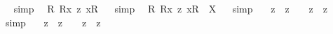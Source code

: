 \begin{isabellebody}
\isadelimproof
\ %
\endisadelimproof
%
\isatagproof
{}\isamarkupfalse%
\ {\isacharparenleft}simp{\isacharparenright}\ \isamarkupfalse%
%
\endisatagproof
{\isafoldproof}%
%
\isadelimproof
%
\endisadelimproof
\isanewline
{}\isamarkupfalse%
\ {\isachardoublequoteopen}{\isacharbrackleft}{\isasymforall}{\isacharparenleft}{\isasymlambda}R{\isachardot}\ {\isacharless}{\isachardot}R{\isachardot}{\isasymbullet}{\isachardot}x{\isachardot}{\isachargreater}\ {\isasymrightarrow}\isactrlsup z\ {\isacharless}{\isachardot}x{\isachardot}{\isasymcirc}{\isachardot}R{\isachardot}{\isachargreater}{\isacharparenright}{\isacharbrackright}{\isachardoublequoteclose}%
\isadelimproof
\ %
\endisadelimproof
%
\isatagproof
{}\isamarkupfalse%
\ {\isacharparenleft}simp{\isacharparenright}\ \isamarkupfalse%
%
\endisatagproof
{\isafoldproof}%
%
\isadelimproof
%
\endisadelimproof
\isanewline
{}\isamarkupfalse%
\ {\isachardoublequoteopen}{\isasymforall}{\isacharparenleft}{\isasymlambda}R{\isachardot}\ {\isacharless}{\isachardot}R{\isachardot}{\isasymbullet}{\isachardot}x{\isachardot}{\isachargreater}\ {\isasymrightarrow}\isactrlsup z\ {\isacharless}{\isachardot}x{\isachardot}{\isasymcirc}{\isachardot}R{\isachardot}{\isachargreater}{\isacharparenright}\ {\isacharequal}\ X{\isachardoublequoteclose}%
\isadelimproof
\ %
\endisadelimproof
%
\isatagproof
{}\isamarkupfalse%
\ {\isacharparenleft}simp{\isacharparenright}\ \isamarkupfalse%
%
\endisatagproof
{\isafoldproof}%
%
\isadelimproof
%
\endisadelimproof
%
\isamarkuptrue%
\isamarkupfalse%
\ {\isachardoublequoteopen}{\isacharcomma}{\isasymphi}{\isacharcomma}\ {\isasymand}\isactrlsup z\ {\isacharcomma}{\isasympsi}{\isacharcomma}\ {\isasymrightarrow}\isactrlsup z\ {\isacharcomma}{\isasymchi}{\isacharcomma}\ {\isasymequiv}\ {\isacharparenleft}{\isacharcomma}{\isasymphi}{\isacharcomma}\ {\isasymand}\isactrlsup z\ {\isacharcomma}{\isasympsi}{\isacharcomma}{\isacharparenright}\ {\isasymrightarrow}\isactrlsup z\ {\isacharcomma}{\isasymchi}{\isacharcomma}{\isachardoublequoteclose}%
\isadelimproof
\ %
\endisadelimproof
%
\isatagproof
{}\isamarkupfalse%
\ {\isacharparenleft}simp{\isacharparenright}\ \isamarkupfalse%
%
\endisatagproof
{\isafoldproof}%
%
\isadelimproof
%
\endisadelimproof
\isanewline
{}\isamarkupfalse%
\ {\isachardoublequoteopen}{\isacharcomma}{\isasymphi}{\isacharcomma}\ {\isasymand}\isactrlsup z\ {\isacharcomma}{\isasympsi}{\isacharcomma}\ {\isasymrightarrow}\isactrlsup z\ {\isacharcomma}{\isasymchi}{\isacharcomma}\ {\isasymequiv}\ {\isacharcomma}{\isasymphi}{\isacharcomma}\ {\isasymand}\isactrlsup z\ {\isacharparenleft}{\isacharcomma}{\isasympsi}{\isacharcomma}\ {\isasymrightarrow}\isactrlsup z\ {\isacharcomma}{\isasymchi}{\isacharcomma}{\isacharparenright}{\isachardoublequoteclose}%

\end{isabellebody}
